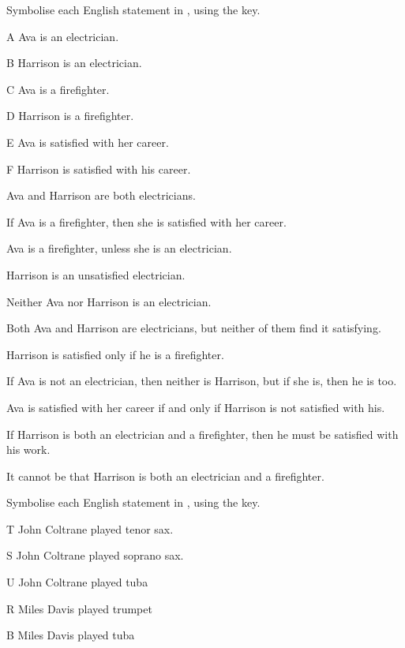 \documentclass[PHIL101-Textbook.tex]{subfiles}
\begin{document}
\noindent\solutions 
\problempart\label{pr.avacareer} Symbolise each English statement in \tfl, using the key.
	\begin{ekey}
		\item[A] Ava is an electrician.
		\item[B] Harrison is an electrician.
		\item[C] Ava is a firefighter.
		\item[D] Harrison is a firefighter.
		\item[E] Ava is satisfied with her career.
		\item[F] Harrison is satisfied with his career.
	\end{ekey}
\begin{earg}
\item Ava and Harrison are both electricians.
\item If Ava is a firefighter, then she is satisfied with her career.
\item Ava is a firefighter, unless she is an electrician.
\item Harrison is an unsatisfied electrician.
\item Neither Ava nor Harrison is an electrician.
\item Both Ava and Harrison are electricians, but neither of them find it satisfying.
\item Harrison is satisfied only if he is a firefighter.
\item If Ava is not an electrician, then neither is Harrison, but if she is, then he is too.
\item Ava is satisfied with her career if and only if Harrison is not satisfied with his.
\item If Harrison is both an electrician and a firefighter, then he must be satisfied with his work.
\item It cannot be that Harrison is both an electrician and a firefighter.
\end{earg}


\noindent\problempart \label{pr.jazzinstruments}Symbolise each English statement in \tfl, using the key.
\begin{ekey}
\item[T] John Coltrane played tenor sax.
\item[S] John Coltrane played soprano sax.
\item[U] John Coltrane played tuba
\item[R] Miles Davis played trumpet
\item[B] Miles Davis played tuba
\end{ekey}
\end{document}
